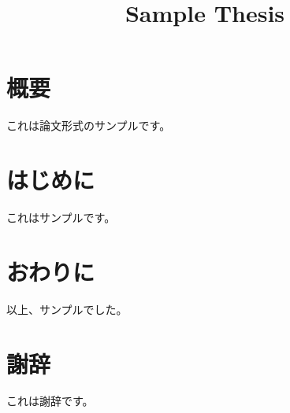\documentclass[a4paper,11pt,oneside,openany,report]{jsbook}
\title{Sample Thesis}
\begin{document}
\frontmatter
\maketitle
\chapter{概要}\label{ch:概要}
これは論文形式のサンプルです。

\tableofcontents
\listoffigures
\listoftables
\mainmatter
\chapter{はじめに}\label{ch:はじめに}
これはサンプルです。

\chapter{おわりに}\label{ch:おわりに}
以上、サンプルでした。

\backmatter
\chapter{謝辞}\label{ch:謝辞}
これは謝辞です。
\end{document}
